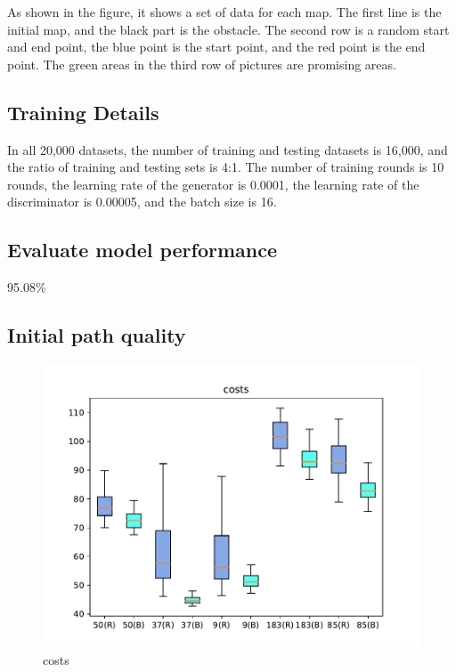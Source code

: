 \documentclass[smallcondensed]{svjour3}     %
\begin{document}
As shown in the figure, it shows a set of data for each map. 
The first line is the initial map, and the black part is the obstacle. 
The second row is a random start and end point, the blue point is the start point, and the red point is the end point. 
The green areas in the third row of pictures are promising areas.

\subsection{Training Details}
In all 20,000 datasets, the number of training and testing datasets is 16,000, and the ratio of training and testing sets is 4:1. 
The number of training rounds is 10 rounds, the learning rate of the generator is 0.0001, the learning rate of the discriminator is 0.00005, and the batch size is 16.

\subsection{Evaluate model performance}
95.08\%

\subsection{Initial path quality}

\begin{figure}
\centering
\includegraphics[scale=0.45]{costs.pdf}%
\caption{costs}     
\label{fig:costs}
\end{figure}
\end{document}
